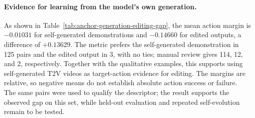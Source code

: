 \paragraph{Evidence for learning from the model's own generation.}
As shown in Table~\ref{tab:anchor-generation-editing-gap}, the mean action
margin is $-0.01031$ for self-generated demonstrations and $-0.14660$ for
edited outputs, a difference of $+0.13629$. The metric prefers the
self-generated demonstration in 125 pairs and the edited output in 3,
with no ties; manual review gives 114, 12, and 2, respectively.
Together with the qualitative examples,
this supports using self-generated T2V videos as target-action evidence
for editing. The margins are relative, so negative means do not establish
absolute action success or failure. The same pairs were used to qualify
the descriptor; the result supports the observed gap on this set, while
held-out evaluation and repeated self-evolution remain to be tested.
